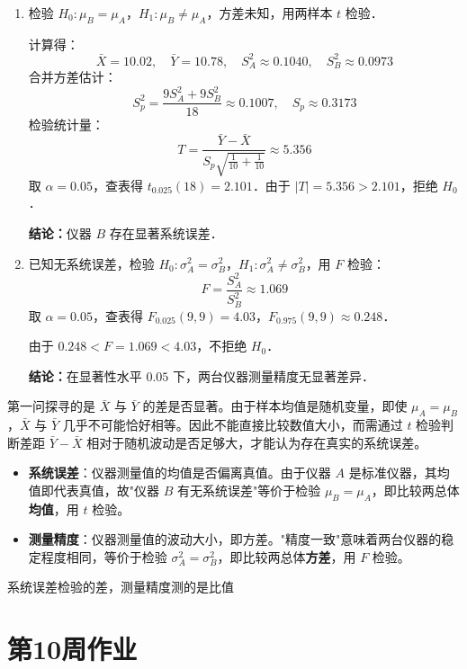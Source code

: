 \begin{solution}
\begin{enumerate}
    \item[(1)] 检验 $H_0: \mu_B = \mu_A$，$H_1: \mu_B \neq \mu_A$，方差未知，用两样本 $t$ 检验．

    计算得：
    \[
    \bar{X} = 10.02,\quad \bar{Y} = 10.78,\quad S_A^2 \approx 0.1040,\quad S_B^2 \approx 0.0973
    \]
    合并方差估计：
    \[
    S_p^2 = \frac{9S_A^2 + 9S_B^2}{18} \approx 0.1007,\quad S_p \approx 0.3173
    \]
    检验统计量：
    \[
    T = \frac{\bar{Y} - \bar{X}}{S_p\sqrt{\frac{1}{10}+\frac{1}{10}}} \approx 5.356
    \]
    取 $\alpha = 0.05$，查表得 $t_{0.025}(18) = 2.101$．由于 $|T| = 5.356 > 2.101$，拒绝 $H_0$．

    \textbf{结论：}仪器 $B$ 存在显著系统误差．

    \item[(2)] 已知无系统误差，检验 $H_0: \sigma_A^2 = \sigma_B^2$，$H_1: \sigma_A^2 \neq \sigma_B^2$，用 $F$ 检验：
    \[
    F = \frac{S_A^2}{S_B^2} \approx 1.069
    \]
    取 $\alpha = 0.05$，查表得 $F_{0.025}(9,9) = 4.03$，$F_{0.975}(9,9) \approx 0.248$．

    由于 $0.248 < F = 1.069 < 4.03$，不拒绝 $H_0$．

    \textbf{结论：}在显著性水平 $0.05$ 下，两台仪器测量精度无显著差异．
\end{enumerate}
\end{solution}
\begin{dxtips}
    第一问探寻的是 $\bar{X}$ 与 $\bar{Y}$ 的差是否显著。由于样本均值是随机变量，即使 $\mu_A = \mu_B$，$\bar{X}$ 与 $\bar{Y}$ 几乎不可能恰好相等。因此不能直接比较数值大小，而需通过 $t$ 检验判断差距 $\bar{Y} - \bar{X}$ 相对于随机波动是否足够大，才能认为存在真实的系统误差。
\end{dxtips}
\begin{itemize}
    \item \textbf{系统误差}：仪器测量值的均值是否偏离真值。由于仪器 $A$ 是标准仪器，其均值即代表真值，故"仪器 $B$ 有无系统误差"等价于检验 $\mu_B = \mu_A$，即比较两总体\textbf{均值}，用 $t$ 检验。
    \item \textbf{测量精度}：仪器测量值的波动大小，即方差。"精度一致"意味着两台仪器的稳定程度相同，等价于检验 $\sigma_A^2 = \sigma_B^2$，即比较两总体\textbf{方差}，用 $F$ 检验。
\end{itemize}
\begin{dxtips}
    系统误差检验的差，测量精度测的是比值
\end{dxtips}
\section{第10周作业}
